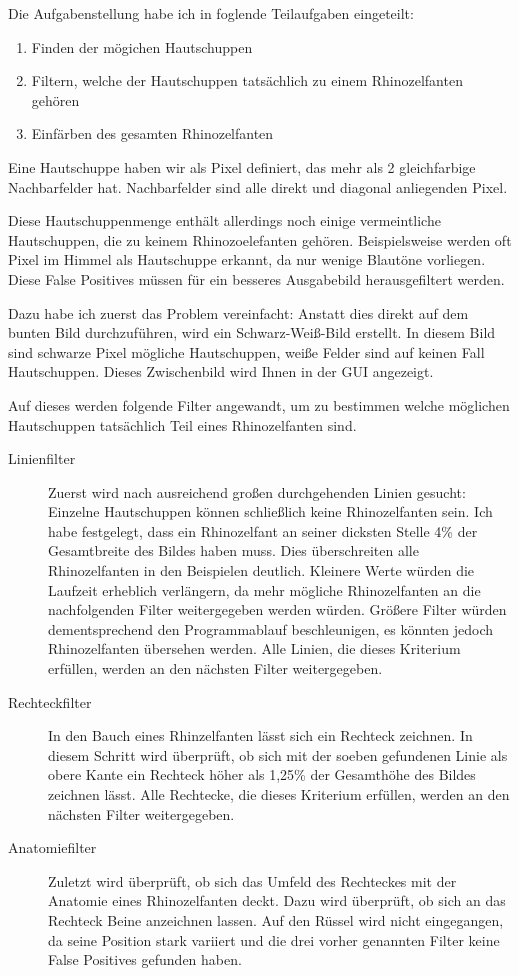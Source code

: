 Die Aufgabenstellung habe ich in foglende Teilaufgaben eingeteilt:
\begin{enumerate}
	\item Finden der mögichen Hautschuppen
	\item Filtern, welche der Hautschuppen tatsächlich zu einem Rhinozelfanten gehören
	\item Einfärben des gesamten Rhinozelfanten
\end{enumerate}

Eine Hautschuppe haben wir als Pixel definiert, das mehr als 2 gleichfarbige Nachbarfelder hat. Nachbarfelder sind alle direkt und diagonal anliegenden Pixel.

Diese Hautschuppenmenge enthält allerdings noch einige vermeintliche Hautschuppen, die zu keinem Rhinozoelefanten gehören. Beispielsweise werden oft Pixel im Himmel als Hautschuppe erkannt, da nur wenige Blautöne vorliegen. Diese False Positives müssen für ein besseres Ausgabebild herausgefiltert werden.

Dazu habe ich zuerst das Problem vereinfacht: Anstatt dies direkt auf dem bunten Bild durchzuführen, wird ein Schwarz-Weiß-Bild erstellt. In diesem Bild sind schwarze Pixel mögliche Hautschuppen, weiße Felder sind auf keinen Fall Hautschuppen. Dieses Zwischenbild wird Ihnen in der GUI angezeigt.

Auf dieses werden folgende Filter angewandt, um zu bestimmen welche möglichen Hautschuppen tatsächlich Teil eines Rhinozelfanten sind.

\begin{description}
	\item[Linienfilter] Zuerst wird nach ausreichend großen durchgehenden Linien gesucht: Einzelne Hautschuppen können schließlich keine Rhinozelfanten sein. Ich habe festgelegt, dass ein Rhinozelfant an seiner dicksten Stelle 4\% der Gesamtbreite des Bildes haben muss. Dies überschreiten alle Rhinozelfanten in den Beispielen deutlich. Kleinere Werte würden die Laufzeit erheblich verlängern, da mehr mögliche Rhinozelfanten an die nachfolgenden Filter weitergegeben werden würden. Größere Filter würden dementsprechend den Programmablauf beschleunigen, es könnten jedoch Rhinozelfanten übersehen werden. Alle Linien, die dieses Kriterium erfüllen, werden an den nächsten Filter weitergegeben.
	\item[Rechteckfilter] In den Bauch eines Rhinzelfanten lässt sich ein Rechteck zeichnen. In diesem Schritt wird überprüft, ob sich mit der soeben gefundenen Linie als obere Kante ein Rechteck höher als 1,25\% der Gesamthöhe des Bildes zeichnen lässt. Alle Rechtecke, die dieses Kriterium erfüllen, werden an den nächsten Filter weitergegeben.
	\item[Anatomiefilter] Zuletzt wird überprüft, ob sich das Umfeld des Rechteckes mit der Anatomie eines Rhinozelfanten deckt. Dazu wird überprüft, ob sich an das Rechteck Beine anzeichnen lassen. Auf den Rüssel wird nicht eingegangen, da seine Position stark variiert und die drei vorher genannten Filter keine False Positives gefunden haben.
\end{description}

